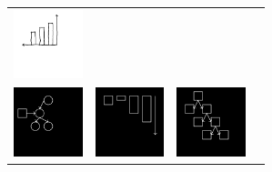 \documentclass{article}
\newcommand{\exampleImageSize}{2cm}
\theoremstyle{definition}
\begin{document}
\begin{figure}[H]
\begin{minipage}[t]{0.7\linewidth}
\begin{tabular}{llll}
    \includegraphics[width = \exampleImageSize]{figures/expert-58.png}\\
  \includegraphics[width = \exampleImageSize]{figures/60.png}&
  \includegraphics[width = \exampleImageSize]{figures/5.png}&
    \includegraphics[width = \exampleImageSize]{figures/17.png}&

\end{tabular}
\end{minipage}
\end{figure}
\end{document}
